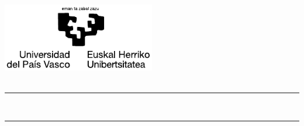 \thispagestyle{empty}

\newcommand{\HRule}{\rule{\linewidth}{0.5mm}} 

\thispagestyle{empty}
\begin{center}
	
  \includegraphics[width=0.5\textwidth]{config/EHU_positivo_fondo_alpha.pdf} \\[0.5cm]
  
  
  {\Large {\saila}}\\[3.0cm]
  
  
  \HRule \\[0.5cm]
  {\LARGE 
    \textbf{\izenburua}
  }
  \HRule \\[0.5cm]

  \Large \textsl{\egilea}\\[1cm]
  

 { \small
  \textbf{\zuzendariaktestua}\\
  \zuzendariak}\\[2cm]  
  \vfill
  
  {\small \phdtext}\\[0.5cm]
  \data

\end{center}
